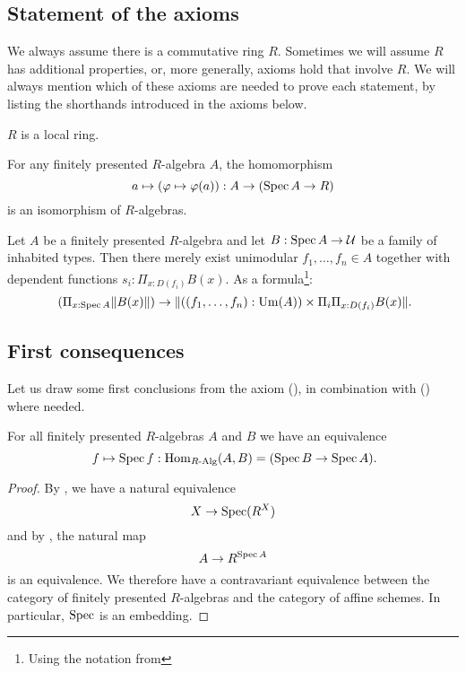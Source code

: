 \subsection{Statement of the axioms}
We always assume there is a commutative ring $R$.
Sometimes we will assume $R$ has additional properties, or, more generally,
axioms hold that involve $R$.
We will always mention which of these axioms are needed to prove each statement,
by listing the shorthands introduced in the axioms below.

\begin{axiom}[Loc]%
  \label{loc}
  $R$ is a local ring.
\end{axiom}

\begin{axiom}[SQC]%
  \label{sqc}
  For any finitely presented $R$-algebra $A$, the homomorphism
  \[ a \mapsto (\varphi\mapsto \varphi(a)) : A \to (\operatorname{Spec} A \to R)\]
  is an isomorphism of $R$-algebras.
\end{axiom}

\begin{axiom}[Z-choice]%
  \label{Z-choice}
  Let $A$ be a finitely presented $R$-algebra
  and let $B : \operatorname{Spec} A \to \mathcal{U}$ be a family of inhabited types.
  Then there merely exist unimodular $f_1, \dots, f_n \in A$
  together with dependent functions $s_i : \Pi_{x : D(f_i)} B(x)$.
  As a formula\footnote{Using the notation from }:
  \[ (\Pi_{x : \Spec A} \propTrunc{B(x)}) \to
     \propTrunc{ ((f_1,\dots,f_n):\Um(A)) \times
      \Pi_i \Pi_{x : D(f_i)} B(x) }
     \rlap{.}
  \]
\end{axiom}

\subsection{First consequences}

Let us draw some first conclusions from the axiom (),
in combination with () where needed.

\begin{proposition}%
  \label{spec-embedding}
  For all finitely presented $R$-algebras $A$ and $B$ we have an equivalence
  \[
    f\mapsto \Spec f : \Hom_{\Alg{R}}(A,B) = (\Spec B \to \Spec A)
    \rlap{.}
  \]
\end{proposition}

\begin{proof}
  By , we have a natural equivalence
  \[
    X\to \operatorname{Spec} (R^X)
  \]
  and by , the natural map
  \[
    A\to R^{\operatorname{Spec} A}
  \]
  is an equivalence.
  We therefore have a contravariant equivalence between
  the category of finitely presented $R$-algebras
  and the category of affine schemes.
  In particular, $\operatorname{Spec}$ is an embedding.
\end{proof}

